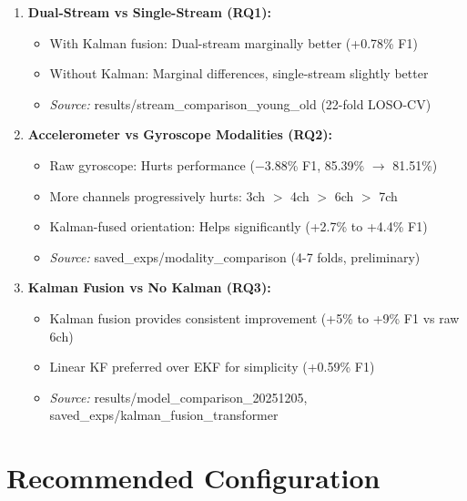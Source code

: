 \documentclass{article}
\begin{document}
\begin{enumerate}
    \item \textbf{Dual-Stream vs Single-Stream (RQ1):}
    \begin{itemize}
        \item With Kalman fusion: Dual-stream marginally better (+0.78\% F1)
        \item Without Kalman: Marginal differences, single-stream slightly better
        \item \textit{Source:} results/stream\_comparison\_young\_old (22-fold LOSO-CV)
    \end{itemize}

    \item \textbf{Accelerometer vs Gyroscope Modalities (RQ2):}
    \begin{itemize}
        \item Raw gyroscope: Hurts performance ($-$3.88\% F1, 85.39\% $\rightarrow$ 81.51\%)
        \item More channels progressively hurts: 3ch $>$ 4ch $>$ 6ch $>$ 7ch
        \item Kalman-fused orientation: Helps significantly (+2.7\% to +4.4\% F1)
        \item \textit{Source:} saved\_exps/modality\_comparison (4-7 folds, preliminary)
    \end{itemize}

    \item \textbf{Kalman Fusion vs No Kalman (RQ3):}
    \begin{itemize}
        \item Kalman fusion provides consistent improvement (+5\% to +9\% F1 vs raw 6ch)
        \item Linear KF preferred over EKF for simplicity (+0.59\% F1)
        \item \textit{Source:} results/model\_comparison\_20251205, saved\_exps/kalman\_fusion\_transformer
    \end{itemize}
\end{enumerate}

\appendix

\section{Recommended Configuration}
\end{document}
